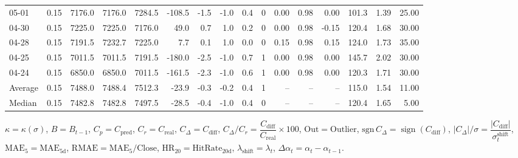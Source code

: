 \begin{threeparttable}
{\begin{tabular}{lrrrrrrrrrrrrrrr}
  05-01 &     0.15 & 7176.0 & 7176.0 & 7284.5 &     -108.5 &           -1.5 &                     -1.0 &                 0.4 &              0 &       0.00 &      0.98 &           0.00 &            101.3 &            1.39 &                  25.00 \\
  04-30 &     0.15 & 7225.0 & 7225.0 & 7176.0 &       49.0 &            0.7 &                      1.0 &                 0.2 &              0 &       0.00 &      0.98 &          -0.15 &            120.4 &            1.68 &                  30.00 \\
  04-28 &     0.15 & 7191.5 & 7232.7 & 7225.0 &        7.7 &            0.1 &                      1.0 &                 0.0 &              0 &       0.15 &      0.98 &           0.15 &            124.0 &            1.73 &                  35.00 \\
  04-25 &     0.15 & 7011.5 & 7011.5 & 7191.5 &     -180.0 &           -2.5 &                     -1.0 &                 0.7 &              1 &       0.00 &      0.98 &           0.00 &            145.7 &            2.02 &                  30.00 \\
  04-24 &     0.15 & 6850.0 & 6850.0 & 7011.5 &     -161.5 &           -2.3 &                     -1.0 &                 0.6 &              1 &       0.00 &      0.98 &           0.00 &            120.3 &            1.71 &                  30.00 \\
Average &     0.15 & 7488.0 & 7488.4 & 7512.3 &      -23.9 &           -0.3 &                     -0.2 &                 0.4 &              1 &         -- &        -- &             -- &            115.0 &            1.54 &                  11.00 \\
 Median &     0.15 & 7482.8 & 7482.8 & 7497.5 &      -28.5 &           -0.4 &                     -1.0 &                 0.4 &              0 &         -- &        -- &             -- &            120.4 &            1.65 &                   5.00 \\
\bottomrule
\end{tabular}
}
\begin{tablenotes}\footnotesize
\item $\kappa=\kappa(\sigma)$, $B=B_{t-1}$, $C_p=C_{\text{pred}}$, $C_r=C_{\text{real}}$, $C_\Delta=C_{\text{diff}}$, $C_\Delta/C_r=\dfrac{C_{\text{diff}}}{C_{\text{real}}}\times100$, $\mathrm{Out}=\text{Outlier}$, $\mathrm{sgn}\,C_\Delta=\operatorname{sign}(C_{\text{diff}})$, $|C_\Delta|/\sigma=\dfrac{|C_{\text{diff}}|}{\sigma_t^{\text{shift}}}$, $\mathrm{MAE}_5=\mathrm{MAE}_{5\text{d}}$, $\mathrm{RMAE}= \mathrm{MAE}_5 / \text{Close}$, $\mathrm{HR}_{20}=\mathrm{HitRate}_{20\text{d}}$, 
$\lambda_{\text{shift}}=\lambda_t$, 
$\Delta\alpha_t=\alpha_t-\alpha_{t-1}$.
\end{tablenotes}
\end{threeparttable}
\endgroup

